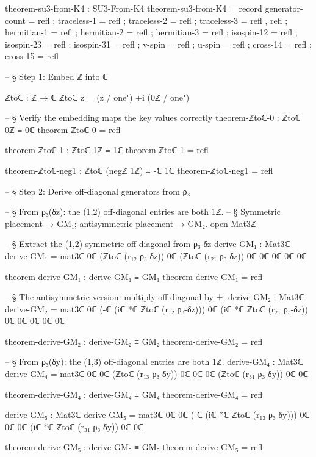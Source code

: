 \documentclass[11pt,a4paper]{book}
\begin{document}
\begin{code}
theorem-su3-from-K4 : SU3-From-K4
theorem-su3-from-K4 = record
  { generator-count = refl
  ; traceless-1     = refl
  ; traceless-2     = refl
  ; traceless-3     = refl , refl
  ; hermitian-1     = refl
  ; hermitian-2     = refl
  ; hermitian-3     = refl
  ; isospin-12      = refl
  ; isospin-23      = refl
  ; isospin-31      = refl
  ; v-spin          = refl
  ; u-spin          = refl
  ; cross-14        = refl
  ; cross-15        = refl
  }

-- § Step 1: Embed ℤ into ℂ

ℤtoℂ : ℤ → ℂ
ℤtoℂ z = (z / one⁺) +i (0ℤ / one⁺)

-- § Verify the embedding maps the key values correctly
theorem-ℤtoℂ-0 : ℤtoℂ 0ℤ ≡ 0ℂ
theorem-ℤtoℂ-0 = refl

theorem-ℤtoℂ-1 : ℤtoℂ 1ℤ ≡ 1ℂ
theorem-ℤtoℂ-1 = refl

theorem-ℤtoℂ-neg1 : ℤtoℂ (negℤ 1ℤ) ≡ -ℂ 1ℂ
theorem-ℤtoℂ-neg1 = refl

-- § Step 2: Derive off-diagonal generators from ρ₃

-- § From ρ₃(δz): the (1,2) off-diagonal entries are both 1ℤ.
-- § Symmetric placement → GM₁; antisymmetric placement → GM₂.
open Mat3ℤ

-- § Extract the (1,2) symmetric off-diagonal from ρ₃-δz
derive-GM₁ : Mat3ℂ
derive-GM₁ = mat3ℂ 0ℂ (ℤtoℂ (r₁₂ ρ₃-δz)) 0ℂ
                    (ℤtoℂ (r₂₁ ρ₃-δz)) 0ℂ 0ℂ
                    0ℂ 0ℂ 0ℂ

theorem-derive-GM₁ : derive-GM₁ ≡ GM₁
theorem-derive-GM₁ = refl

-- § The antisymmetric version: multiply off-diagonal by ±i
derive-GM₂ : Mat3ℂ
derive-GM₂ = mat3ℂ 0ℂ (-ℂ (iℂ *ℂ ℤtoℂ (r₁₂ ρ₃-δz))) 0ℂ
                    (iℂ *ℂ ℤtoℂ (r₂₁ ρ₃-δz)) 0ℂ 0ℂ
                    0ℂ 0ℂ 0ℂ

theorem-derive-GM₂ : derive-GM₂ ≡ GM₂
theorem-derive-GM₂ = refl

-- § From ρ₃(δy): the (1,3) off-diagonal entries are both 1ℤ.
derive-GM₄ : Mat3ℂ
derive-GM₄ = mat3ℂ 0ℂ 0ℂ (ℤtoℂ (r₁₃ ρ₃-δy))
                    0ℂ 0ℂ 0ℂ
                    (ℤtoℂ (r₃₁ ρ₃-δy)) 0ℂ 0ℂ

theorem-derive-GM₄ : derive-GM₄ ≡ GM₄
theorem-derive-GM₄ = refl

derive-GM₅ : Mat3ℂ
derive-GM₅ = mat3ℂ 0ℂ 0ℂ (-ℂ (iℂ *ℂ ℤtoℂ (r₁₃ ρ₃-δy)))
                    0ℂ 0ℂ 0ℂ
                    (iℂ *ℂ ℤtoℂ (r₃₁ ρ₃-δy)) 0ℂ 0ℂ

theorem-derive-GM₅ : derive-GM₅ ≡ GM₅
theorem-derive-GM₅ = refl


\end{code}
\end{document}
